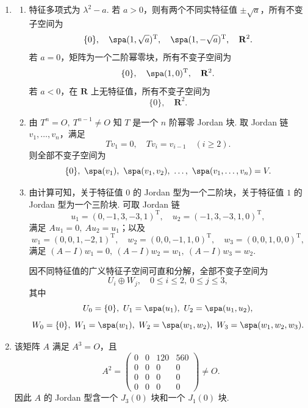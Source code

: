 \begin{enumerate}
    \item
    \begin{enumerate}
        \item 特征多项式为 $\lambda^2-a$.
        若 $a>0$，则有两个不同实特征值 $\pm\sqrt{a}$，所有不变子空间为
        \[
            \{0\},\quad \spa(1,\sqrt{a})^{\mathrm{T}},\quad \spa(1,-\sqrt{a})^{\mathrm{T}},\quad \mathbf{R}^2.
        \]
        若 $a=0$，矩阵为一个二阶幂零块，所有不变子空间为
        \[
            \{0\},\quad \spa(1,0)^{\mathrm{T}},\quad \mathbf{R}^2.
        \]
        若 $a<0$，在 $\mathbf{R}$ 上无特征值，所有不变子空间为
        \[
            \{0\},\quad \mathbf{R}^2.
        \]

        \item 由 $T^n=O,\ T^{n-1}\neq O$ 知 $T$ 是一个 $n$ 阶幂零 Jordan 块. 取 Jordan 链 $v_1,\ldots,v_n$，满足
        \[
            Tv_1=0,\quad Tv_i=v_{i-1}\quad(i\geqslant 2).
        \]
        则全部不变子空间为
        \[
            \{0\},\ \spa(v_1),\ \spa(v_1,v_2),\ \ldots,\ \spa(v_1,\ldots,v_n)=V.
        \]

        \item 由计算可知，关于特征值 $0$ 的 Jordan 型为一个二阶块，关于特征值 $1$ 的 Jordan 型为一个三阶块. 可取 Jordan 链
        \[
            u_1=(0,-1,3,-3,1)^{\mathrm{T}},\quad
            u_2=(-1,3,-3,1,0)^{\mathrm{T}},
        \]
        满足 $Au_1=0,\ Au_2=u_1$；以及
        \[
            w_1=(0,0,1,-2,1)^{\mathrm{T}},\quad
            w_2=(0,0,-1,1,0)^{\mathrm{T}},\quad
            w_3=(0,0,1,0,0)^{\mathrm{T}},
        \]
        满足 $(A-I)w_1=0,\ (A-I)w_2=w_1,\ (A-I)w_3=w_2$.

        因不同特征值的广义特征子空间可直和分解，全部不变子空间为
        \[
            U_i\oplus W_j,\quad 0\leqslant i\leqslant 2,\ 0\leqslant j\leqslant 3,
        \]
        其中
        \[
            U_0=\{0\},\ U_1=\spa(u_1),\ U_2=\spa(u_1,u_2),
        \]
        \[
            W_0=\{0\},\ W_1=\spa(w_1),\ W_2=\spa(w_1,w_2),\ W_3=\spa(w_1,w_2,w_3).
        \]
    \end{enumerate}

    \item 该矩阵 $A$ 满足 $A^3=O$，且
    \[
        A^2=
        \begin{pmatrix}
            0&0&120&560\\
            0&0&0&0\\
            0&0&0&0\\
            0&0&0&0
        \end{pmatrix}\neq O.
    \]
    因此 $A$ 的 Jordan 型含一个 $J_3(0)$ 块和一个 $J_1(0)$ 块.


\end{enumerate}
